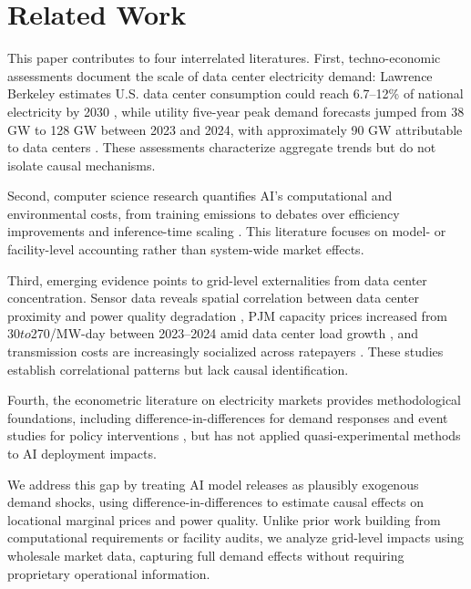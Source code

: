 \documentclass[sigconf]{acmart}
\begin{document}
\section{Related Work}

This paper contributes to four interrelated literatures. First, techno-economic assessments document the scale of data center electricity demand: Lawrence Berkeley estimates U.S. data center consumption could reach 6.7–12\% of national electricity by 2030 \cite{shehabi2024}, while utility five-year peak demand forecasts jumped from 38 GW to 128 GW between 2023 and 2024, with approximately 90 GW attributable to data centers \cite{gridstrategies2025}. These assessments characterize aggregate trends but do not isolate causal mechanisms.

Second, computer science research quantifies AI's computational and environmental costs, from training emissions \cite{strubell19, schwartz2020green} to debates over efficiency improvements \cite{RN2, RN8} and inference-time scaling \cite{kim2025cost}. This literature focuses on model- or facility-level accounting rather than system-wide market effects.

Third, emerging evidence points to grid-level externalities from data center concentration. Sensor data reveals spatial correlation between data center proximity and power quality degradation \cite{nicoletti2024}, PJM capacity prices increased from $30 to $270/MW-day between 2023–2024 amid data center load growth \cite{cmu2025}, and transmission costs are increasingly socialized across ratepayers \cite{jacobs2025}. These studies establish correlational patterns but lack causal identification.

Fourth, the econometric literature on electricity markets provides methodological foundations, including difference-in-differences for demand responses \cite{roth2024did} and event studies for policy interventions \cite{pnnl2022}, but has not applied quasi-experimental methods to AI deployment impacts.

We address this gap by treating AI model releases as plausibly exogenous demand shocks, using difference-in-differences to estimate causal effects on locational marginal prices and power quality. Unlike prior work building from computational requirements or facility audits, we analyze grid-level impacts using wholesale market data, capturing full demand effects without requiring proprietary operational information.
\end{document}
